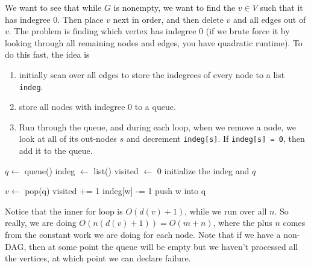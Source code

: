 \documentclass{article}
\begin{document}
    \begin{algo}
      We want to see that while $G$ is nonempty, we want to find the $v \in V$ such that it has indegree $0$. Then place $v$ next in order, and then delete $v$ and all edges out of $v$. The problem is finding which vertex has indegree $0$ (if we brute force it by looking through all remaining nodes and edges, you have quadratic runtime). To do this fast, the idea is 
      \begin{enumerate}
        \item initially scan over all edges to store the indegrees of every node to a list \texttt{indeg}. 
        \item store all nodes with indegree $0$ to a queue. 
        \item Run through the queue, and during each loop, when we remove a node, we look at all of its out-nodes $s$ and decrement \texttt{indeg[s]}. If \texttt{indeg[s] = 0}, then add it to the queue. 
      \end{enumerate}
      \begin{algorithm}[H]
        \label{alg:recursive_top_sort}
        \begin{algorithmic}[1]
          \State $q \gets$ queue() 
          \State indeg $\gets$ list() 
          \State visited $\gets$ 0
            \State initialize the indeg and $q$ 

              \State $v \gets$ pop(q) 
              \State visited += 1 
                \State indeg[w] -= 1 
                  \State push w into q 
                \EndIf
              \EndFor
            \EndWhile

              \State {}
            \EndIf

            \State {}
          \EndFunction
        \end{algorithmic}
      \end{algorithm}
      Notice that the inner for loop is $O(d(v) + 1)$, while we run over all $n$. So really, we are doing $O(n(d(v) + 1)) = O(m + n)$, where the plus $n$ comes from the constant work we are doing for each node. Note that if we have a non-DAG, then at some point the queue will be empty but we haven't processed all the vertices, at which point we can declare failure. 
    \end{algo}
\end{document}
